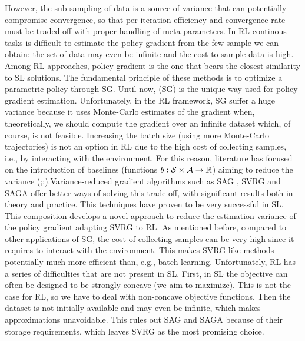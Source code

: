 However, the sub-sampling of data is a source of variance that can potentially compromise convergence, so that per-iteration efficiency and convergence rate must be traded off with proper handling of meta-parameters. In \acs{RL} continous tasks is difficult to estimate the policy gradient from the few sample we can obtain: the set of data may even be infinite and the cost to sample data is high.
Among RL approaches, policy gradient is the one that bears the closest similarity to \acs{SL} solutions. The fundamental principle of these methods is to optimize a parametric policy through \acs{SG}.
Until now, (\acs{SG}) is the unique way used for policy gradient estimation. Unfortunately, in the \acs{RL} framework, \acs{SG} suffer a huge variance because it uses Monte-Carlo estimates of the gradient when, theoretically, we should compute the gradient over an infinite dataset which, of course, is not feasible. Increasing the batch size (using more Monte-Carlo trajectories) is not an option in \acs{RL} due to the high cost of collecting samples, i.e., by interacting with the environment. For this reason, literature has focused on the introduction of baselines  (\ie functions $b : \mathcal{S} \times \mathcal{A} \to \mathbb R$) aiming to reduce the variance (\cite{williams1992simple};\cite{peters2008reinforcement};\cite{thomas2017policy}).\newline Variance-reduced gradient algorithms such as \acs{SAG} \citep{roux2012stochastic}, \acs{SVRG} \citep{allen2016variance} and \acs{SAGA} \citep{defazio2014saga} offer better ways of solving this trade-off, with significant results both in theory and practice. This techniques have proven to be very successful in \acs{SL}.\newline
This composition develops a novel approach to reduce the estimation variance of the policy gradient adapting \acs{SVRG} to \acs{RL}.\newline
As mentioned before, compared to other applications of \acs{SG}, the cost of collecting samples can be very high since it requires to interact with the environment.
This makes \ac{SVRG}-like methods potentially much more efficient than, e.g., batch learning. 
Unfortunately, RL has a series of difficulties that are not present in \acs{SL}. First, in \acs{SL} the objective can often be designed to be strongly concave (we aim to maximize). This is not the case for \acs{RL}, so we have to deal with non-concave objective functions. Then the dataset is not initially available and may even be infinite, which makes approximations unavoidable. This rules out \acs{SAG} and \acs{SAGA} because of their storage requirements, which leaves \acs{SVRG} as the most promising choice.
